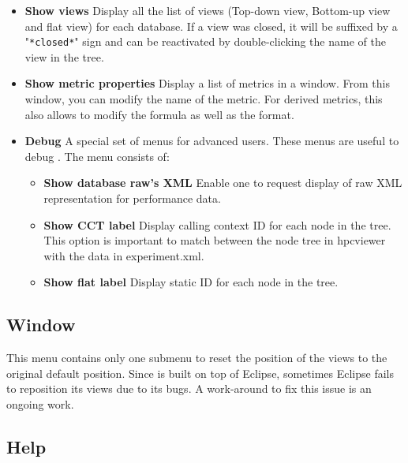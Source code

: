 \documentclass[english]{article}
\begin{document}
\begin{itemize}
 \item \textbf{Show views}
 Display all the list of views (Top-down view, Bottom-up view and flat view) for each database. If a view was closed, it will be suffixed by a "\texttt{*closed*}" sign and can be reactivated by double-clicking the name of the view in the tree.

 \item \textbf{Show metric properties}
 Display a list of metrics in a window. From this window, you can modify the name of the metric. For derived metrics, this also allows to modify the formula as well as the format.

 \item \textbf{Debug}
 A special set of menus for advanced users. These menus are useful to debug . The menu consists of:

   \begin{itemize}
     \item \textbf{Show database raw's XML}
 	Enable one to request display of raw XML representation for performance data.

     \item \textbf{Show CCT label}
 	Display calling context ID for each node in the tree. This option is important to match between the node tree in hpcviewer with the data in experiment.xml.

     \item \textbf{Show flat label}
 	Display static ID for each node in the tree.
  \end{itemize}

\end{itemize}

\subsection{Window}
This menu contains only one submenu to reset the position of the views to the original default position.
Since  is built on top of Eclipse, sometimes Eclipse fails to reposition its views due to its bugs.
A work-around to fix this issue is an ongoing work.


\subsection{Help}
\end{document}
